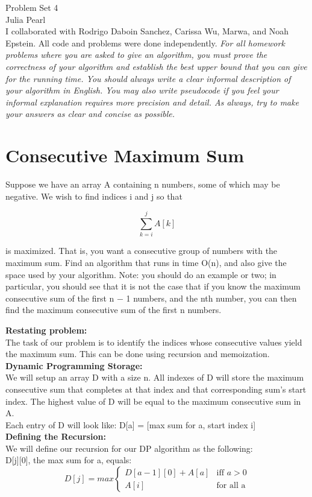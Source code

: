 \documentclass[11pt, solution, letterpaper]{format}
\begin{document}
Problem Set 4\\
Julia Pearl\\

I collaborated with Rodrigo Daboin Sanchez, Carissa Wu, Marwa, and Noah Epstein. All code and problems were done independently.
\clearpage
\emph{For all homework problems where you are asked to give an algorithm, you must prove the correctness of your
algorithm and establish the best upper bound that you can give for the running time. You should always write a
clear informal description of your algorithm in English. You may also write pseudocode if you feel your informal
explanation requires more precision and detail. As always, try to make your answers as clear and concise as
possible.}\\



\section{Consecutive Maximum Sum}
 Suppose we have an array A containing n numbers, some of which may be negative. We wish to find indices i and j
so that

$$\sum_{k=i}^{j} A[k]$$

is maximized. That is, you want a consecutive group of numbers with the maximum sum. Find an algorithm that runs
in time O(n), and also give the space used by your algorithm. Note: you should do an example or two; in particular,
you should see that it is not the case that if you know the maximum consecutive sum of the first n − 1 numbers, and
the nth number, you can then find the maximum consecutive sum of the first n numbers.

\textbf{Restating problem:}\\The task of our problem is to identify the indices whose consecutive values yield the maximum sum. This can be done using recursion and memoization.\\

\textbf{Dynamic Programming Storage:}\\
We will setup an array D with a size n. All indexes of D will store the maximum consecutive sum that completes at that index and that corresponding sum's start index. The highest value of D will be equal to the maximum consecutive sum in A. \\

Each entry of D will look like:
D[a] = [max sum for a, start index i]\\
\textbf{Defining the Recursion:}\\
We will define our recursion for our DP algorithm as the following: \\
D[j][0], the max sum for a, equals:
 \[
  D[j] = max 
  \begin{cases}
                                   D[a-1][0] + A[a]  & \text{iff $a>0$} \\
                                   A[i] & \text{for all a}
  \end{cases}
\]
\end{document}
